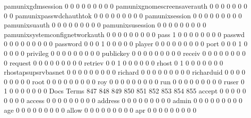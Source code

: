 \documentclass[compress,8pt]{beamer}
\begin{document}
\begin{frame}
\begin{Schunk}
  pamunixgdmsession                          0   0   0   0   0   0   0   0   0
  pamunixgnomescreensaverauth                0   0   0   0   0   0   0   0   0
  pamunixpasswdchauthtok                     0   0   0   0   0   0   0   0   0
  pamunixsession                             0   0   0   0   0   0   0   0   0
  pamunixsuauth                              0   0   0   0   0   0   0   0   0
  pamunixsusession                           0   0   0   0   0   0   0   0   0
  pamunixsystemconfignetworkauth             0   0   0   0   0   0   0   0   0
  pass                                       1   0   0   0   0   0   0   0   0
  passwd                                     0   0   0   0   0   0   0   0   0
  password                                   0   0   0   1   0   0   0   0   0
  player                                     0   0   0   0   0   0   0   0   0
  port                                       0   0   0   1   0   0   0   0   0
  privileg                                   0   0   0   0   0   0   0   0   0
  publickey                                  0   0   0   0   0   0   0   0   0
  receiv                                     0   0   0   0   0   0   0   0   0
  request                                    0   0   0   0   0   0   0   0   0
  retriev                                    0   0   1   0   0   0   0   0   0
  rhost                                      0   1   0   0   0   0   0   0   0
  rhostapsupsrvbasnet                        0   0   0   0   0   0   0   0   0
  richard                                    0   0   0   0   0   0   0   0   0
  richarduid                                 0   0   0   0   0   0   0   0   0
  root                                       0   0   0   0   0   0   0   0   0
  roy                                        0   0   0   0   0   0   0   0   0
  run                                        0   0   0   0   0   0   0   0   0
  ruser                                      0   1   0   0   0   0   0   0   0
                                          Docs
Terms                                      847 848 849 850 851 852 853 854 855
  accept                                     0   0   0   0   0   0   0   0   0
  access                                     0   0   0   0   0   0   0   0   0
  address                                    0   0   0   0   0   0   0   0   0
  admin                                      0   0   0   0   0   0   0   0   0
  age                                        0   0   0   0   0   0   0   0   0
  allow                                      0   0   0   0   0   0   0   0   0
  apr                                        0   0   0   0   0   0   0   0   0

\end{Schunk}
\end{frame}
\end{document}
